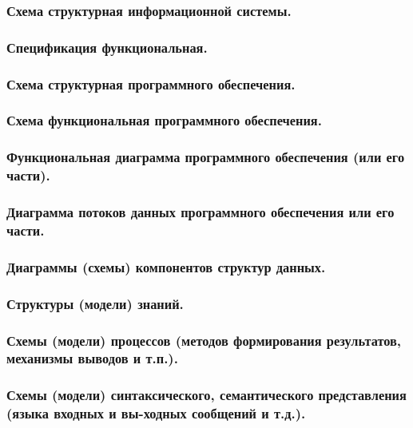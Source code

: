 \documentclass[utf8x, 12pt, oneside, a4paper]{article}
\begin{document}
	\subsubsection{\textbf{Схема структурная информационной системы.}}

	\subsubsection{\textbf{Спецификация функциональная.}}

	\subsubsection{Схема структурная программного обеспечения.}

	\subsubsection{\textbf{Схема функциональная программного обеспечения.}}

	\subsubsection{\textbf{Функциональная диаграмма программного обеспечения (или его части).}}

	\subsubsection{\textbf{Диаграмма потоков данных программного обеспечения или его части.}}

	\subsubsection{\textbf{Диаграммы (схемы) компонентов структур данных.}}

	\subsubsection{\textbf{Структуры (модели) знаний.}}

	\subsubsection{\textbf{Схемы (модели) процессов (методов формирования результатов, механизмы выводов и т.п.).}}

	\subsubsection{\textbf{Схемы (модели) синтаксического, семантического представления (языка входных и вы-ходных сообщений и т.д.).}}
\end{document}
